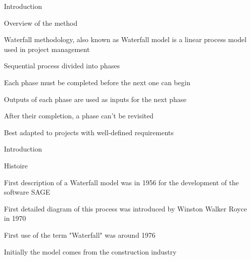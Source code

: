 \begin{frame}{Introduction}

   \begin{block}{Overview of the method}

   \item Waterfall methodology, also known as Waterfall model is a linear process model used in project management

   \item Sequential process divided into phases
   
   \item Each phase must be completed before the next one can begin

   \item Outputs of each phase are used as inputs for the next phase

   \item After their completion, a phase can't be revisited

   \item Best adapted to projects with well-defined requirements

   \end{block}

\end{frame}

\begin{frame}{Introduction}

   \begin{block}{Histoire}

   \item First description of a Waterfall model was in 1956 for the development of the software SAGE

   \item First detailed diagram of this process was introduced by Winston Walker Royce in 1970

   \item First use of the term "Waterfall" was around 1976

   \item Initially the model comes from the construction industry

   \end{block}

\end{frame}